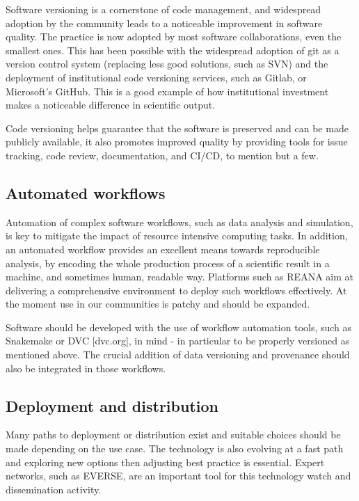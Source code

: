 Software versioning is a cornerstone of code management, and widespread adoption by the community leads to a noticeable improvement in software quality. The practice is now adopted by most software collaborations, even the smallest ones. This has been possible with the widespread adoption of git as a version control system (replacing less good solutions, such as SVN) and the deployment of institutional code versioning services, such as Gitlab, or Microsoft's GitHub. This is a good example of how institutional investment makes a noticeable difference in scientific output.

Code versioning helps guarantee that the software is preserved and can be made publicly available, it also promotes improved quality by providing tools for issue tracking, code review, documentation, and CI/CD, to mention but a few. 


\subsection{Automated workflows}

Automation of complex software workflows, such as data analysis and simulation, is key to mitigate the impact of resource intensive computing tasks. In addition, an automated workflow provides an excellent means towards reproducible analysis, by encoding the whole production process of a scientific result in a machine, and sometimes human, readable way. Platforms such as REANA aim at delivering a comprehensive environment to deploy such workflows effectively. At the moment use in our communities is patchy and should be expanded.

Software should be developed with the use of workflow automation tools, such as Snakemake or DVC [dvc.org], in mind - in particular to be properly versioned as mentioned above. The crucial addition of data versioning and provenance should also be integrated in those workflows. 

\subsection{Deployment and distribution}

Many paths to deployment or distribution exist and suitable choices should be made depending on the use case. The technology is also evolving at a fast path and exploring new options then adjusting best practice is essential. Expert networks, such as EVERSE, are an important tool for this technology watch and dissemination activity. 

